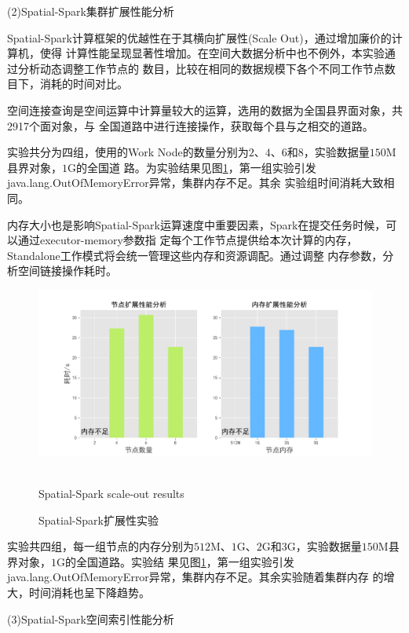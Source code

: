 (2)Spatial-Spark集群扩展性能分析

Spatial-Spark计算框架的优越性在于其横向扩展性(Scale Out)，通过增加廉价的计算机，使得
计算性能呈现显著性增加。在空间大数据分析中也不例外，本实验通过分析动态调整工作节点的
数目，比较在相同的数据规模下各个不同工作节点数目下，消耗的时间对比。

空间连接查询是空间运算中计算量较大的运算，选用的数据为全国县界面对象，共2917个面对象，与
全国道路中进行连接操作，获取每个县与之相交的道路。

实验共分为四组，使用的Work Node的数量分别为$2$、$4$、$6$和$8$，实验数据量$150$M县界对象，$1$G的全国道
路。为实验结果见图\ref{fig:node_memory}，第一组实验引发java.lang.OutOfMemoryError异常，集群内存不足。其余
实验组时间消耗大致相同。

内存大小也是影响Spatial-Spark运算速度中重要因素，Spark在提交任务时候，可以通过executor-memory参数指
定每个工作节点提供给本次计算的内存，Standalone工作模式将会统一管理这些内存和资源调配。通过调整
内存参数，分析空间链接操作耗时。
\begin{figure}
  \centering
  \includegraphics[scale=0.5]{figures/node_memory.pdf} \ \
  \caption{Spatial-Spark扩展性实验}{Spatial-Spark scale-out results}
  \label{fig:node_memory}
\end{figure}

实验共四组，每一组节点的内存分别为$512$M、$1$G、$2$G和$3$G，实验数据量$150$M县界对象，$1$G的全国道路。实验结
果见图\ref{fig:node_memory}，第一组实验引发java.lang.OutOfMemoryError异常，集群内存不足。其余实验随着集群内存
的增大，时间消耗也呈下降趋势。

(3)Spatial-Spark空间索引性能分析

